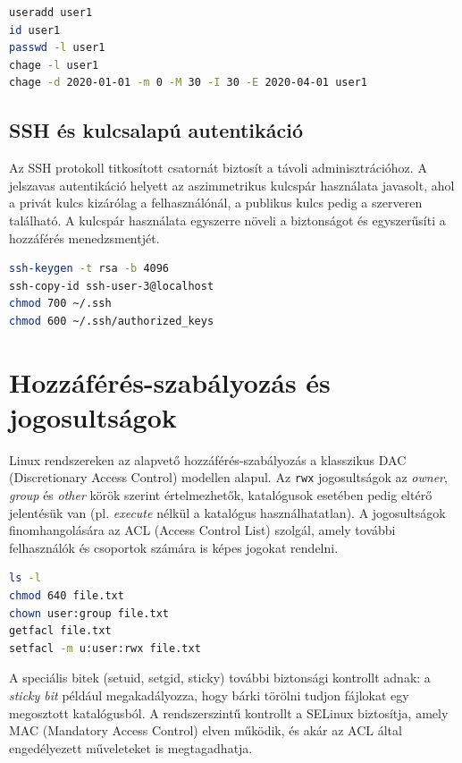 \documentclass[12pt,a4paper]{article}
\begin{document}
\begin{lstlisting}[language=bash,caption={Felhasználó és jelszó-életciklus kezelés}]
useradd user1
id user1
passwd -l user1
chage -l user1
chage -d 2020-01-01 -m 0 -M 30 -I 30 -E 2020-04-01 user1
\end{lstlisting}

\subsection{SSH és kulcsalapú autentikáció}
Az SSH protokoll titkosított csatornát biztosít a távoli adminisztrációhoz. A jelszavas autentikáció helyett az aszimmetrikus kulcspár használata javasolt, ahol a privát kulcs kizárólag a felhasználónál, a publikus kulcs pedig a szerveren található. A kulcspár használata egyszerre növeli a biztonságot és egyszerűsíti a hozzáférés menedzsmentjét.

\begin{lstlisting}[language=bash,caption={Kulcspár létrehozás és telepítés}]
ssh-keygen -t rsa -b 4096
ssh-copy-id ssh-user-3@localhost
chmod 700 ~/.ssh
chmod 600 ~/.ssh/authorized_keys
\end{lstlisting}



\section{Hozzáférés-szabályozás és jogosultságok}
Linux rendszereken az alapvető hozzáférés-szabályozás a klasszikus DAC (Discretionary Access Control) modellen alapul. Az \texttt{rwx} jogosultságok az \textit{owner}, \textit{group} és \textit{other} körök szerint értelmezhetők, katalógusok esetében pedig eltérő jelentésük van (pl. \textit{execute} nélkül a katalógus használhatatlan). A jogosultságok finomhangolására az ACL (Access Control List) szolgál, amely további felhasználók és csoportok számára is képes jogokat rendelni.

\begin{lstlisting}[language=bash,caption={Jogosultságok és ACL kezelése}]
ls -l
chmod 640 file.txt
chown user:group file.txt
getfacl file.txt
setfacl -m u:user:rwx file.txt
\end{lstlisting}

A speciális bitek (setuid, setgid, sticky) további biztonsági kontrollt adnak: a \textit{sticky bit} például megakadályozza, hogy bárki törölni tudjon fájlokat egy megosztott katalógusból. A rendszerszintű kontrollt a SELinux biztosítja, amely MAC (Mandatory Access Control) elven működik, és akár az ACL által engedélyezett műveleteket is megtagadhatja.
\end{document}
